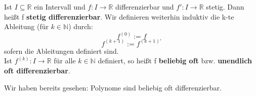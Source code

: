 \begin{Definition}{
	Ist $I \subseteq \mathbb{R}$ ein Intervall und 
	$f: I \rightarrow \mathbb{R}$ differenzierbar und $f':I \rightarrow \mathbb{R}$
	stetig. Dann heißt f \textbf{stetig differenzierbar}. 
	Wir definieren weiterhin induktiv die 
	k-te Ableitung (für $k \in \mathbb{N}$) durch:
	\begin{equation*}
		f^{(0)} := f 
	\end{equation*}
	\begin{equation*}
	f^{(k+1)} := f^{(k+1)'}
	\end{equation*}
	sofern die Ableitungen definiert sind.\\
	Ist $f^{(k)}: I \rightarrow \mathbb{R}$ für alle $k \in \mathbb{N}$ definiert, 
	so heißt f \textbf{beliebig oft} bzw. \textbf{unendlich oft differenzierbar}. \\
	
}\end{Definition}

\begin{Bemerkung}{Wir haben bereits gesehen: Polynome sind beliebig oft
	 differenzierbar.
}\end{Bemerkung}